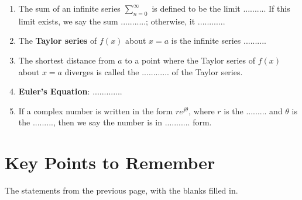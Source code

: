 \documentclass{article}
\begin{document}
\begin{enumerate}
	\item The sum of an infinite series $\sum\limits_{n=0}^\infty$ is defined to be the limit .......... If this limit exists, we say the sum ...........; otherwise, it ............
	\item The \textbf{Taylor series} of $f(x)$ about $x=a$ is the infinite series ..........
	\item The shortest distance from $a$ to a point where the Taylor series of $f(x)$ about $x=a$ diverges is called the ............ of the Taylor series.
	\item \textbf{Euler's Equation}: .............
	\item If a complex number is written in the form $re^{j\theta}$, where $r$ is the ......... and $\theta$ is the ........., then we say the number is in ........... form.
\end{enumerate}

\clearpage

\section{Key Points to Remember}

The statements from the previous page, with the blanks filled in.
\end{document}

